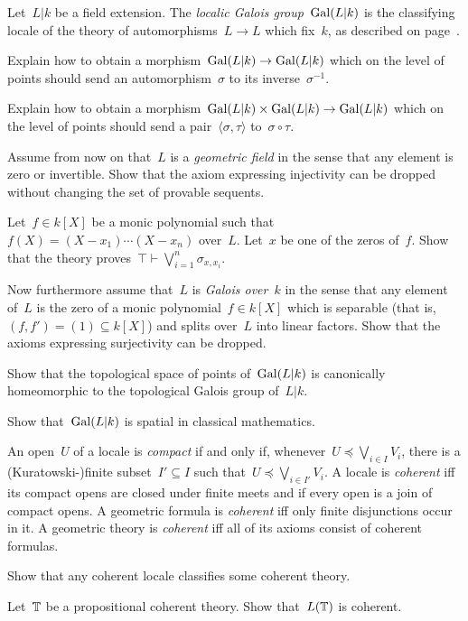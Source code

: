 \documentclass{ws-rv9x6}
\begin{document}
{\begin{exercise}%
Let~$L|k$ be a field extension. The \emph{localic Galois group}~$\mathrm{Gal}(L|k)$
is the classifying locale of the theory of automorphisms~$L \to L$ which
fix~$k$, as described on page~\pageref{par:theory-automorphisms}.
\begin{alphlist}[(g)]
\item Explain how to obtain a morphism~$\mathrm{Gal}(L|k) \to \mathrm{Gal}(L|k)$ which on the
level of points should send an automorphism~$\sigma$ to its inverse~$\sigma^{-1}$.
\item Explain how to obtain a morphism~$\mathrm{Gal}(L|k) \times \mathrm{Gal}(L|k) \to \mathrm{Gal}(L|k)$ which on the
level of points should send a pair~$\langle \sigma, \tau \rangle$ to~$\sigma \circ \tau$.
\item Assume from now on that~$L$ is a \emph{geometric field} in the sense that any
element is zero or invertible. Show that the axiom expressing injectivity can
be dropped without changing the set of provable sequents.
\item Let~$f \in k[X]$ be a monic polynomial such that~$f(X) =
(X-x_1)\cdots(X-x_n)$ over~$L$. Let~$x$ be one of the zeros of~$f$. Show that
the theory proves~$\top \vdash \bigvee_{i=1}^n \sigma_{x,x_i}$.
\item Now furthermore assume that~$L$ is \emph{Galois over}~$k$ in the sense that
any element of~$L$ is the zero of a monic polynomial~$f \in k[X]$ which is
separable (that is,~$(f,f') = (1) \subseteq k[X]$) and splits over~$L$ into
linear factors. Show that the axioms expressing surjectivity can be dropped.
\item Show that the topological space of points of~$\mathrm{Gal}(L|k)$ is canonically
homeomorphic to the topological Galois group of~$L|k$.
\item Show that~$\mathrm{Gal}(L|k)$ is spatial in classical mathematics.
\end{alphlist}
\end{exercise}

\begin{exercise}%
\label{ex:coherent}%
An open~$U$ of a locale is \emph{compact} if and only if, whenever~$U
\preceq \bigvee_{i \in I} V_i$, there is a (Kuratowski-)finite subset~$I'
\subseteq I$ such that~$U \preceq \bigvee_{i \in I'} V_i$. A locale is
\emph{coherent} iff its compact opens are closed under finite meets and if
every open is a join of compact opens. A geometric formula is \emph{coherent} iff only
finite disjunctions occur in it. A geometric theory is \emph{coherent}
iff all of its axioms consist of coherent formulas.
\begin{alphlist}[(d)]
\item Show that any coherent locale classifies some coherent theory.
\item Let~$\mathbb{T}$ be a propositional coherent theory. Show that~$L(\mathbb{T})$ is
coherent.\smallskip


\end{alphlist}
\end{exercise}}
\end{document}
